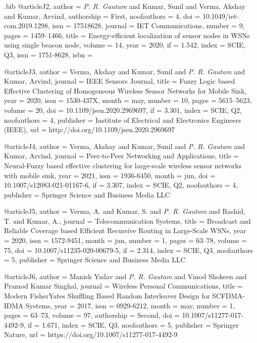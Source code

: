 \begin{filecontents}{\jobname .bib}
@article{J2,
  author      = {\emph{P. R. Gautam} and Kumar, Sunil and Verma, Akshay and Kumar, Arvind},
  authorship  = {First},
  noofauthors = {4},
  doi         = {10.1049/iet-com.2019.1298},
  issn        = {17518628},
  journal     = {IET Communications},
  number      = {9},
  pages       = {1459--1466},
  title       = {Energy-efficient localization of sensor nodes in WSNs using single beacon node},
  volume      = {14},
  year        = {2020},
  if          = {1.542},
  index       = {SCIE, Q3},
  issn        = {1751-8628},
  isbn        = {}
}

@article{J3,
  author      = {Verma, Akshay and Kumar, Sunil and \emph{P. R. Gautam} and Kumar, Arvind},
  journal     = {IEEE Sensors Journal},
  title       = {Fuzzy Logic based Effective Clustering of Homogeneous Wireless Sensor Networks for Mobile Sink},
  year        = {2020},
  issn        = {1530-437X},
  month       = {may},
  number      = {10},
  pages       = {5615--5623},
  volume      = {20},
  doi         = {10.1109/jsen.2020.2969697},
  if          = {3.301},
  index       = {SCIE, Q2},
  noofauthors = {4},
  publisher   = {Institute of Electrical and Electronics Engineers ({IEEE})},
  url         = {http://doi.org/10.1109/jsen.2020.2969697}
}

@article{J4,
  author      = {Verma, Akshay and Kumar, Sunil and \emph{P. R. Gautam} and Kumar, Arvind},
  journal     = {Peer-to-Peer Networking and Applications},
  title       = {Neural-Fuzzy based effective clustering for large-scale wireless sensor networks with mobile sink},
  year        = {2021},
  issn        = {1936-6450},
  month       = {jun},
  doi         = {10.1007/s12083-021-01167-6},
  if          = {3.307},
  index       = {SCIE, Q2},
  noofauthors = {4},
  publisher   = {Springer Science and Business Media {LLC}}
}

@article{J5,
  author      = {Verma, A. and Kumar, S. and \emph{P. R. Gautam} and Rashid, T. and Kumar, A.},
  journal     = {Telecommunication Systems},
  title       = {Broadcast and Reliable Coverage based Efficient Recursive Routing in Large-Scale WSNs},
  year        = {2020},
  issn        = {1572-9451},
  month       = {jun},
  number      = {1},
  pages       = {63--78},
  volume      = {75},
  doi         = {10.1007/s11235-020-00679-5},
  if          = {2.314},
  index       = {SCIE, Q3},
  noofauthors = {5},
  publisher   = {Springer Science and Business Media {LLC}}
}

@article{J6,
  author      = {Manish Yadav and \emph{P. R. Gautam} and Vinod Shokeen and Pramod Kumar Singhal},
  journal     = {Wireless Personal Communications},
  title       = {Modern Fisher{\textendash}Yates Shuffling Based Random Interleaver Design for {SCFDMA}-{IDMA} Systems},
  year        = {2017},
  issn        = {0929-6212},
  month       = {may},
  number      = {1},
  pages       = {63--73},
  volume      = {97},
  authorship  = {Second},
  doi         = {10.1007/s11277-017-4492-9},
  if          = {1.671},
  index       = {SCIE, Q3},
  noofauthors = {5},
  publisher   = {Springer Nature},
  url         = {https://doi.org/10.1007/s11277-017-4492-9}
}


\end{filecontents}
